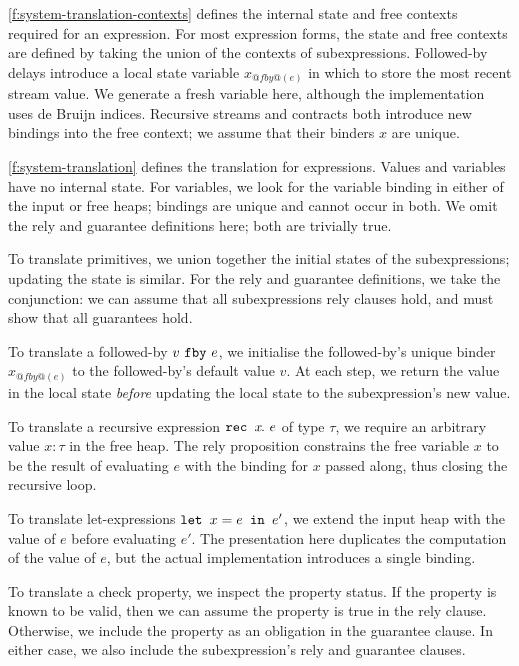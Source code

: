 

\autoref{f:system-translation-contexts} defines the internal state and free contexts required for an expression.
For most expression forms, the state and free contexts are defined by taking the union of the contexts of subexpressions.
Followed-by delays introduce a local state variable $x_{@fby@(e)}$ in which to store the most recent stream value.
We generate a fresh variable here, although the implementation uses de Bruijn indices.
Recursive streams and contracts both introduce new bindings into the free context; we assume that their binders $x$ are unique.

\autoref{f:system-translation} defines the translation for expressions.
Values and variables have no internal state.
For variables, we look for the variable binding in either of the input or free heaps; bindings are unique and cannot occur in both.
We omit the rely and guarantee definitions here; both are trivially true.

To translate primitives, we union together the initial states of the subexpressions; updating the state is similar.
For the rely and guarantee definitions, we take the conjunction: we can assume that all subexpressions rely clauses hold, and must show that all guarantees hold.

To translate a followed-by $v~\texttt{fby}~e$, we initialise the followed-by's unique binder $x_{@fby@(e)}$ to the followed-by's default value $v$.
At each step, we return the value in the local state \emph{before} updating the local state to the subexpression's new value.

To translate a recursive expression $\texttt{rec~} x\hspace{-0.1em}.~e$ of type $\tau$, we require an arbitrary value $x: \tau$ in the free heap.
The rely proposition constrains the free variable $x$ to be the result of evaluating $e$ with the binding for $x$ passed along, thus closing the recursive loop.

To translate let-expressions $\texttt{let~} x = e \texttt{~in~} e'$, we extend the input heap with the value of $e$ before evaluating $e'$.
The presentation here duplicates the computation of the value of $e$, but the actual implementation introduces a single binding.

To translate a check property, we inspect the property status.
If the property is known to be valid, then we can assume the property is true in the rely clause.
Otherwise, we include the property as an obligation in the guarantee clause.
In either case, we also include the subexpression's rely and guarantee clauses.

